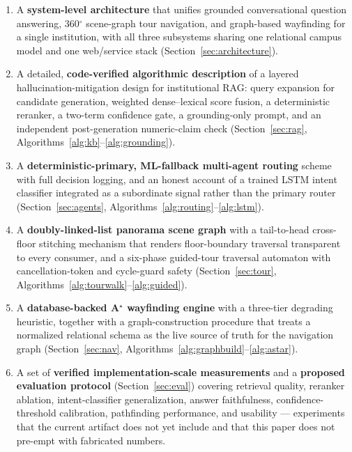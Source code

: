 \begin{enumerate}
\item A \textbf{system-level architecture} that unifies grounded
conversational question answering, 360$^{\circ}$ scene-graph tour
navigation, and graph-based wayfinding for a single institution, with all
three subsystems sharing one relational campus model and one web/service
stack (Section~\ref{sec:architecture}).
\item A detailed, \textbf{code-verified algorithmic description} of a
layered hallucination-mitigation design for institutional RAG: query
expansion for candidate generation, weighted dense--lexical score fusion,
a deterministic reranker, a two-term confidence gate, a grounding-only
prompt, and an independent post-generation numeric-claim check
(Section~\ref{sec:rag}, Algorithms~\ref{alg:kb}--\ref{alg:grounding}).
\item A \textbf{deterministic-primary, ML-fallback multi-agent routing}
scheme with full decision logging, and an honest account of a trained
LSTM intent classifier integrated as a subordinate signal rather than the
primary router (Section~\ref{sec:agents},
Algorithms~\ref{alg:routing}--\ref{alg:lstm}).
\item A \textbf{doubly-linked-list panorama scene graph} with a
tail-to-head cross-floor stitching mechanism that renders floor-boundary
traversal transparent to every consumer, and a six-phase guided-tour
traversal automaton with cancellation-token and cycle-guard safety
(Section~\ref{sec:tour}, Algorithms~\ref{alg:tourwalk}--\ref{alg:guided}).
\item A \textbf{database-backed A$^{\star}$ wayfinding engine} with a
three-tier degrading heuristic, together with a graph-construction
procedure that treats a normalized relational schema as the live source of
truth for the navigation graph (Section~\ref{sec:nav},
Algorithms~\ref{alg:graphbuild}--\ref{alg:astar}).
\item A set of \textbf{verified implementation-scale measurements} and a
\textbf{proposed evaluation protocol} (Section~\ref{sec:eval}) covering
retrieval quality, reranker ablation, intent-classifier generalization,
answer faithfulness, confidence-threshold calibration, pathfinding
performance, and usability --- experiments that the current artifact does
not yet include and that this paper does not pre-empt with fabricated
numbers.
\end{enumerate}

